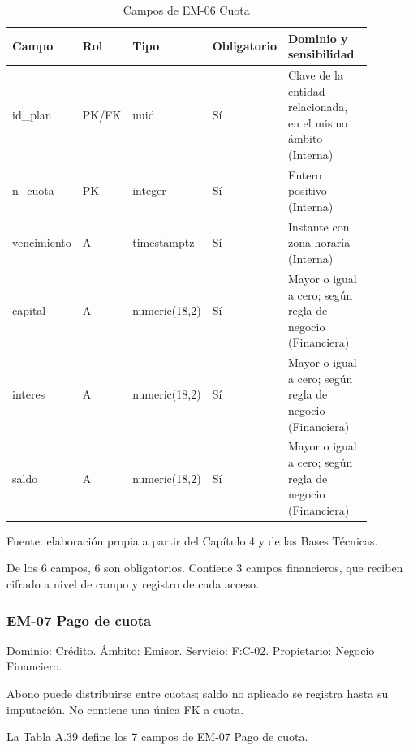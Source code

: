 \documentclass[11pt]{article}
\begin{document}
\begin{table}[htbp]
\caption{Campos de EM-06 Cuota}\label{tab:d_em06}
\centering
\begin{tabular}{@{}p{0.167\linewidth}p{0.070\linewidth}p{0.079\linewidth}p{0.097\linewidth}p{0.465\linewidth}@{}}
\toprule Campo & Rol & Tipo & Obligatorio & Dominio y sensibilidad \\
\midrule
id\_plan & PK/FK & uuid & Sí & Clave de la entidad relacionada, en el mismo ámbito (Interna) \\
n\_cuota & PK & integer & Sí & Entero positivo (Interna) \\
vencimiento & A & timestamptz & Sí & Instante con zona horaria (Interna) \\
capital & A & numeric(18,2) & Sí & Mayor o igual a cero; según regla de negocio (Financiera) \\
interes & A & numeric(18,2) & Sí & Mayor o igual a cero; según regla de negocio (Financiera) \\
saldo & A & numeric(18,2) & Sí & Mayor o igual a cero; según regla de negocio (Financiera) \\
\bottomrule
\end{tabular}
\par\smallskip
{\raggedright Fuente: elaboración propia a partir del Capítulo 4 y de las Bases Técnicas.\par}
\end{table}


De los 6 campos, 6 son obligatorios. Contiene 3 campos financieros, que reciben cifrado a nivel de campo y registro de cada acceso.

\subsubsection{EM-07 Pago de cuota}

Dominio: Crédito. Ámbito: Emisor. Servicio: F:C-02. Propietario: Negocio Financiero.

Abono puede distribuirse entre cuotas; saldo no aplicado se registra hasta su imputación. No contiene una única FK a cuota.

La Tabla A.39 define los 7 campos de EM-07 Pago de cuota.
\end{document}
